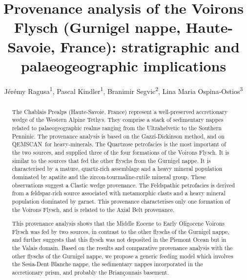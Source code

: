 \documentclass[twoside]{article}
\title{Provenance analysis of the Voirons Flysch (Gurnigel nappe, Haute-Savoie, France): stratigraphic and palaeogeographic implications}
\author{Jérémy Ragusa\textsuperscript{1}, Pascal Kindler\textsuperscript{1}, Branimir Segvic\textsuperscript{2}, Lina Maria Ospina‐Ostios\textsuperscript{3}}
\date{}
\newcommand\registred{\textsuperscript{\tiny\textregistered}}
\begin{document}
\maketitle

{}

\begin{abstract}
The Chablais Prealps (Haute-Savoie, France) represent a well-preserved accretionary wedge of the Western Alpine Tethys. They comprise a stack of sedimentary nappes related to palaeogeographic realms ranging from the Ultrahelvetic to the Southern Penninic. The provenance analysis is based on the Gazzi-Dickinson method, and on QEMSCAN\registred\ for heavy-minerals. The Quartzose petrofacies is the most important of the two sources, and supplied three of the four formations of the Voirons Flysch. It is similar to the sources that fed the other flyschs from the Gurnigel nappe. It is characterised by a mature, quartz-rich assemblage and a heavy mineral population dominated by apatite and the zircon-tourmaline-rutile mineral group. These observations suggest a Clastic wedge provenance. The Feldspathic petrofacies is derived from a feldspar-rich source associated with metamorphic clasts and a heavy mineral population dominated by garnet. This provenance characterises only one formation of the Voirons Flysch, and is related to the Axial Belt provenance.\par
This provenance analysis shows that the Middle Eocene to Early Oligocene Voirons Flysch was fed by two sources, in contrast to the other flyschs of the Gurnigel nappe, and further suggests that this flysch was not deposited in the Piemont Ocean but in the Valais domain. Based on the results and comparative provenance analysis with the other flyschs of the Gurnigel nappe, we propose a generic feeding model which involves the Sesia-Dent Blanche nappe, the sedimentary nappes incorporated in the accretionary prism, and probably the Briançonnais basement.
\end{abstract}
\end{document}
